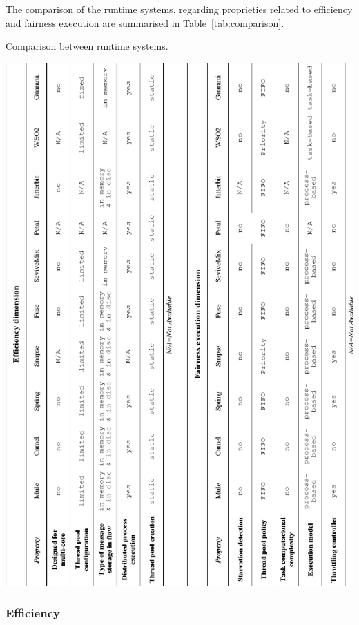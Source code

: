 The comparison of the runtime systems, regarding proprieties related to efficiency and fairness execution are summarised in Table~\ref{tab:comparison}.
\begin{table}[htbp]
	\centering
	\caption{Comparison between runtime systems.}
    \includegraphics[scale=0.8]{./figs/table_dimensions_v.eps}
	\label{tab:comparison}
\end{table}

\subsubsection{Efficiency}
\label{subsubsec:comparasion_efficiency}

